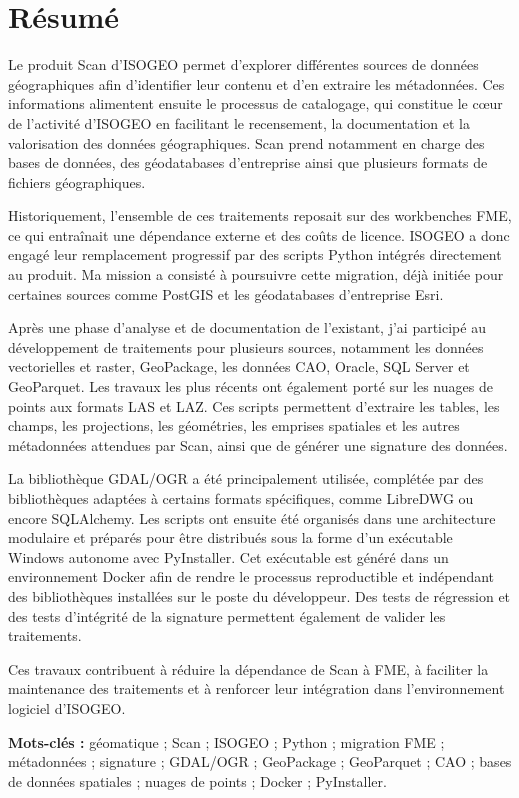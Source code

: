 

\chapter*{Résumé}

Le produit Scan d'ISOGEO permet d'explorer différentes sources de données
géographiques afin d'identifier leur contenu et d'en extraire les métadonnées.
Ces informations alimentent ensuite le processus de catalogage, qui constitue
le cœur de l'activité d'ISOGEO en facilitant le recensement, la documentation et
la valorisation des données géographiques. Scan prend notamment en charge des
bases de données, des géodatabases d'entreprise ainsi que plusieurs formats de
fichiers géographiques.

Historiquement, l'ensemble de ces traitements reposait sur des workbenches FME,
ce qui entraînait une dépendance externe et des coûts de licence. ISOGEO a donc
engagé leur remplacement progressif par des scripts Python intégrés directement
au produit. Ma mission a consisté à poursuivre cette migration, déjà initiée pour
certaines sources comme PostGIS et les géodatabases d'entreprise Esri.

Après une phase d'analyse et de documentation de l'existant, j'ai participé au
développement de traitements pour plusieurs sources, notamment les données
vectorielles et raster, GeoPackage, les données CAO, Oracle, SQL Server et
GeoParquet. Les travaux les plus récents ont également porté sur les nuages de
points aux formats LAS et LAZ. Ces scripts permettent d'extraire les tables, les
champs, les projections, les géométries, les emprises spatiales et les autres
métadonnées attendues par Scan, ainsi que de générer une signature des données.

La bibliothèque GDAL/OGR a été principalement utilisée, complétée par des
bibliothèques adaptées à certains formats spécifiques, comme LibreDWG ou encore SQLAlchemy. Les scripts ont ensuite été organisés dans une architecture modulaire et
préparés pour être distribués sous la forme d'un exécutable Windows autonome avec
PyInstaller. Cet exécutable est généré dans un environnement Docker afin de
rendre le processus reproductible et indépendant des bibliothèques installées sur
le poste du développeur. Des tests de régression et des tests d'intégrité de la
signature permettent également de valider les traitements.

Ces travaux contribuent à réduire la dépendance de Scan à FME, à faciliter la
maintenance des traitements et à renforcer leur intégration dans
l'environnement logiciel d'ISOGEO.

\vspace{0.7cm}

\noindent
\textbf{Mots-clés :}
géomatique ; Scan ; ISOGEO ; Python ; migration FME ; métadonnées ; signature ;
GDAL/OGR ; GeoPackage ; GeoParquet ; CAO ; bases de données spatiales ;
nuages de points ; Docker ; PyInstaller.
